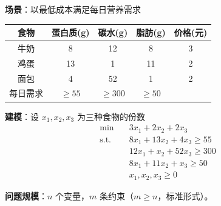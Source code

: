 \documentclass[12pt, a4paper]{ctexart}
\begin{document}
\begin{blackboard}[LP 例子 3：饮食问题]

\textbf{场景}：以最低成本满足每日营养需求

\begin{center}
\begin{tabular}{c|ccc|c}
食物 & 蛋白质(g) & 碳水(g) & 脂肪(g) & 价格(元) \\
\hline
牛奶 & 8 & 12 & 8 & 3 \\
鸡蛋 & 13 & 1 & 11 & 2 \\
面包 & 4 & 52 & 1 & 2 \\
\hline
每日需求 & $\geq 55$ & $\geq 300$ & $\geq 50$ &
\end{tabular}
\end{center}

\textbf{建模}：设 $x_1, x_2, x_3$ 为三种食物的份数
\[
\begin{aligned}
\min \quad & 3x_1 + 2x_2 + 2x_3 \\
\text{s.t.} \quad & 8x_1 + 13x_2 + 4x_3 \geq 55 \\
& 12x_1 + x_2 + 52x_3 \geq 300 \\
& 8x_1 + 11x_2 + x_3 \geq 50 \\
& x_1, x_2, x_3 \geq 0
\end{aligned}
\]

\end{blackboard}

\begin{blackboard}

\textbf{问题规模}：$n$ 个变量，$m$ 条约束（$m \geq n$，标准形式）。

\end{blackboard}
\end{document}
